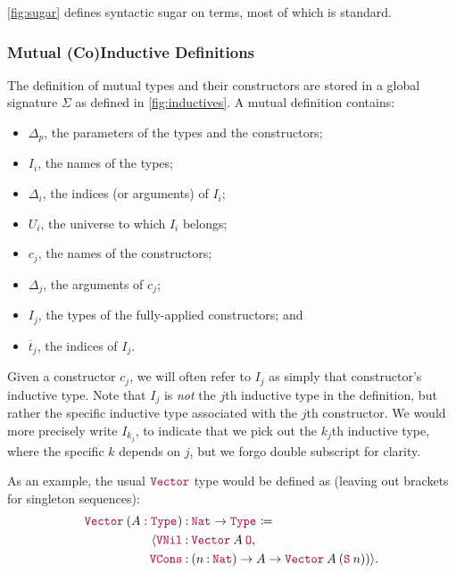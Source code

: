 

\autoref{fig:sugar} defines syntactic sugar on terms, most of which is standard.

\subsubsection{Mutual (Co)Inductive Definitions}



The definition of mutual \coinductive types and their constructors are stored in a global signature $\Sigma$ as defined in \autoref{fig:inductives}.
A mutual \coinductive definition contains:

\begin{itemize}
    \item $\Delta_p$, the parameters of the \coinductive types and the constructors;
    \item $I_i$, the names of the \coinductive types;
    \item $\Delta_i$, the indices (or arguments) of $I_i$;
    \item $U_i$, the universe to which $I_i$ belongs;
    \item $c_j$, the names of the constructors;
    \item $\Delta_j$, the arguments of $c_j$;
    \item $I_j$, the \coinductive types of the fully-applied constructors; and
    \item $\overline{t}_j$, the indices of $I_j$.
\end{itemize}

Given a constructor $c_j$, we will often refer to $I_j$ as simply that constructor's inductive type.
Note that $I_j$ is \textit{not} the $j$th inductive type in the definition, but rather the specific inductive type associated with the $j$th constructor.
We would more precisely write $I_{k_j}$, to indicate that we pick out the $k_j$th inductive type, where the specific $k$ depends on $j$, but we forgo double subscript for clarity.

As an example, the usual $\const{Vector}$ type would be defined as (leaving out brackets for singleton sequences):
\begin{align*}
    \assm{\app{\Vector}{(A : \Type{})}&}{\Nat \to \Type{}} \coloneqq \\
        \seq{\assm{\VNil&}{\app{\Vector}{A}{\Zero}}, \\
        \assm{\VCons&}{(\assm{n}{\Nat}) \to A \to \app{\Vector}{A}{(\app{\Succ}{n}))}}}.
\end{align*}

